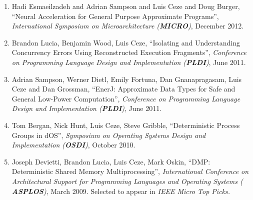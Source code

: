 \noindent\begin{enumerate}

\item Hadi Esmaeilzadeh and Adrian Sampson and Luis Ceze and Doug Burger,
``Neural Acceleration for General Purpose Approximate Programs'', {\em
International Symposium on Microarchitecture ({\bf MICRO})}, December 2012.

\item Brandon Lucia, Benjamin Wood, Luis Ceze, ``Isolating and
  Understanding Concurrency Errors Using Reconstructed Execution
  Fragments'', {\em Conference on Programming Language Design and
    Implementation ({\bf PLDI})}, June 2011.


\item Adrian Sampson, Werner Dietl, Emily Fortuna, Dan Gnanapragasam, Luis
Ceze and Dan Grossman, ``EnerJ: Approximate Data Types for Safe and General
Low-Power Computation'', {\em Conference on Programming Language Design and
Implementation ({\bf PLDI})}, June 2011.

\item Tom Bergan, Nick Hunt, Luis Ceze, Steve Gribble, ``Deterministic Process
Groups in dOS'', {\em Symposium on Operating Systems Design and Implementation
({\bf OSDI})}, October 2010.


\item Joseph Devietti, Brandon Lucia, Luis Ceze, Mark Oskin, ``DMP:
Deterministic Shared Memory Multiprocessing'', {\em International Conference
on Architectural Support for Programming Languages and Operating Systems ({\bf
ASPLOS})}, March 2009. Selected to appear in {\em IEEE Micro Top Picks.}


\end{enumerate}

\nextthing
{}

